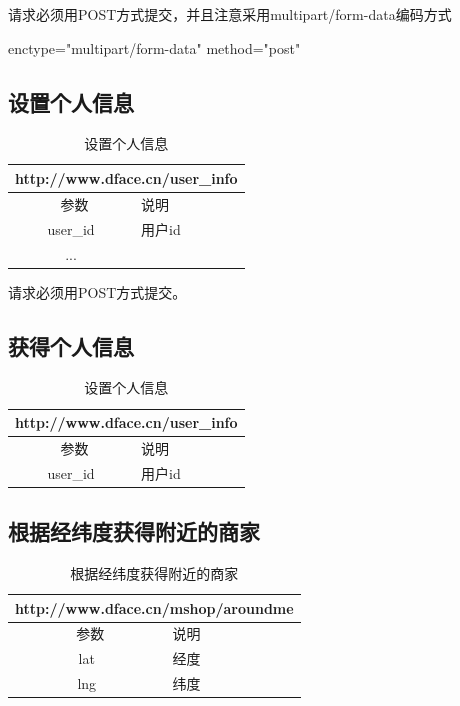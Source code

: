 \documentclass[cs4size]{ctexartutf8}
\begin{document}
请求必须用POST方式提交，并且注意采用multipart/form-data编码方式

enctype="multipart/form-data" method="post"

\subsection{设置个人信息}
\begin{table}[H]
   \begin{center}
\begin{tabular}{|c|p{12cm}|}
\hline
\multicolumn{2}{|c|}{http://www.dface.cn/user\_info} \\
\hline\hline
 \  参数  &  说明  \\
\hline
 user\_id  &  用户id\\
\hline
 ...  &  \\ 
\hline
\end{tabular}
\caption{设置个人信息}
   \end{center}
\end{table}

请求必须用POST方式提交。

\subsection{获得个人信息}
\begin{table}[H]
   \begin{center}
\begin{tabular}{|c|p{12cm}|}
\hline
\multicolumn{2}{|c|}{http://www.dface.cn/user\_info} \\
\hline\hline
 \  参数  &  说明  \\
\hline
 user\_id  &  用户id\\
\hline
\end{tabular}
\caption{设置个人信息}
   \end{center}
\end{table}



\subsection{根据经纬度获得附近的商家}

\begin{table}[H]
   \begin{center}
\begin{tabular}{|c|p{12cm}|}
\hline
\multicolumn{2}{|c|}{http://www.dface.cn/mshop/aroundme} \\
\hline\hline
 \  参数  &  说明  \\
\hline
 lat  &  经度\\
\hline
 lng  &  纬度\\ 
\hline
\end{tabular}
\caption{根据经纬度获得附近的商家}
   \end{center}
\end{table}
\end{document}
